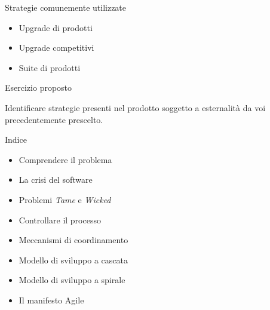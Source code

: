 \documentclass{beamer}
\begin{document}
\begin{frame}
{\centerline{Strategie comunemente utilizzate}}

\begin{itemize}
    \item Upgrade di prodotti
    \item Upgrade competitivi
    \item Suite di prodotti
\end{itemize}

\vspace{1cm}
\begin{center}
    
\end{center}

\end{frame}

\begin{frame}
{\centerline{Esercizio proposto}}
\vspace{1cm}
\begin{center}
    \LARGE{Identificare strategie presenti nel prodotto soggetto a esternalit\`{a} da voi precedentemente prescelto.}
\end{center}

\end{frame}

\begin{frame}
{\centerline{Indice}}
\begin{itemize}
    \item Comprendere il problema
    \item La crisi del software
    \item Problemi \textit{Tame} e \textit{Wicked}
    \item Controllare il processo
    \item Meccanismi di coordinamento
    \item Modello di sviluppo a cascata
    \item Modello di sviluppo a spirale
    \item Il manifesto Agile
\end{itemize} 
\end{frame}
\end{document}
